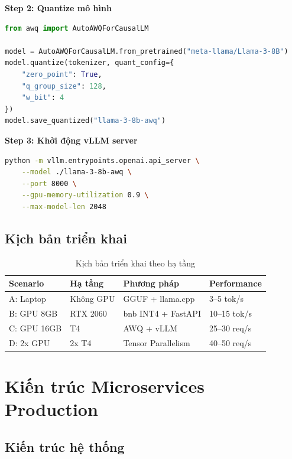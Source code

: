 \documentclass[12pt,a4paper]{report}
\begin{document}
\textbf{Step 2: Quantize mô hình}

\begin{lstlisting}[language=Python,caption={Quantize với AWQ}]
from awq import AutoAWQForCausalLM

model = AutoAWQForCausalLM.from_pretrained("meta-llama/Llama-3-8B")
model.quantize(tokenizer, quant_config={
    "zero_point": True,
    "q_group_size": 128,
    "w_bit": 4
})
model.save_quantized("llama-3-8b-awq")
\end{lstlisting}

\textbf{Step 3: Khởi động vLLM server}

\begin{lstlisting}[language=bash,caption={Khởi động vLLM}]
python -m vllm.entrypoints.openai.api_server \
    --model ./llama-3-8b-awq \
    --port 8000 \
    --gpu-memory-utilization 0.9 \
    --max-model-len 2048
\end{lstlisting}

\subsection{Kịch bản triển khai}

\begin{table}[h]
\centering
\caption{Kịch bản triển khai theo hạ tầng}
\label{tab:deployment-scenarios}
\begin{tabular}{p{2.5cm}p{3cm}p{3.5cm}p{3.5cm}}
\toprule
\textbf{Scenario} & \textbf{Hạ tầng} & \textbf{Phương pháp} & \textbf{Performance} \\
\midrule
A: Laptop & Không GPU & GGUF + llama.cpp & 3--5 tok/s \\
B: GPU 8GB & RTX 2060 & bnb INT4 + FastAPI & 10--15 tok/s \\
C: GPU 16GB & T4 & AWQ + vLLM & 25--30 req/s \\
D: 2x GPU & 2x T4 & Tensor Parallelism & 40--50 req/s \\
\bottomrule
\end{tabular}
\end{table}

\section{Kiến trúc Microservices Production}

\subsection{Kiến trúc hệ thống}
\end{document}
